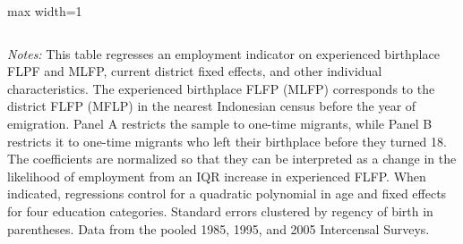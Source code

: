 \begin{center}
\begin{adjustbox}{max width=1\textwidth}
\begin{threeparttable}[!h]
\begin{tabular}{lcccccccc}
\bottomrule
\bottomrule
\end{tabular}
\begin{tablenotes}
\item \footnotesize \textit{Notes:} This table regresses an employment indicator on experienced birthplace FLPF and MLFP, current district fixed effects, and other individual characteristics. The experienced birthplace FLFP (MLFP) corresponds to the district FLFP (MFLP) in the nearest Indonesian census before the year of emigration. Panel A restricts the sample to one-time migrants, while Panel B restricts it to one-time migrants who left their birthplace before they turned 18. The coefficients are normalized so that they can be interpreted as a change in the likelihood of employment from an IQR increase in experienced FLFP. When indicated, regressions control for a quadratic polynomial in age and fixed effects for four education categories. Standard errors clustered by regency of birth in parentheses. Data from the pooled 1985, 1995, and 2005 Intercensal Surveys. 
\end{tablenotes}
\end{threeparttable}
\end{adjustbox}
\end{center}
